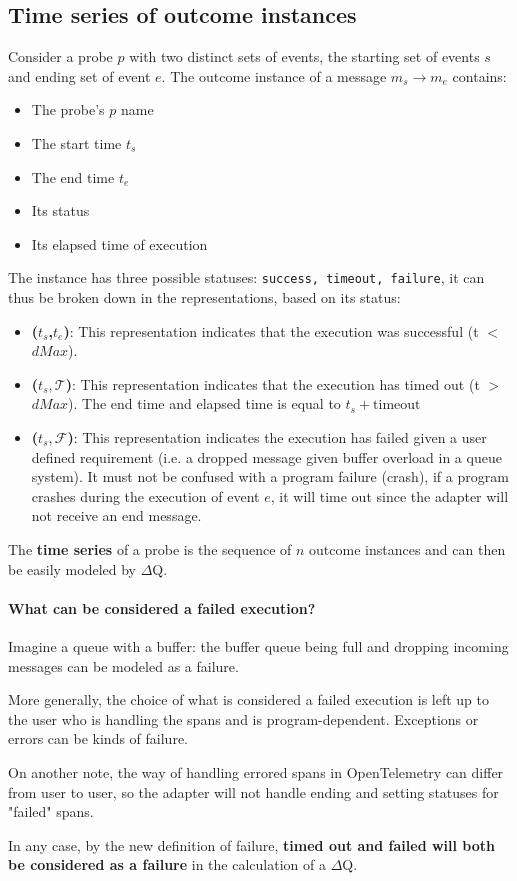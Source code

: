\subsection{Time series of outcome instances}
    Consider a probe $p$ with two distinct sets of events, the starting set of events $s$ and ending set of event $e$. The outcome instance of a message $m_s \rightarrow m_e$ contains:
    \begin{itemize}
        \item The probe's $p$ name
        \item The start time $t_s$
        \item The end time $t_e$
        \item Its status 
        \item Its elapsed time of execution
    \end{itemize}
    The instance has three possible statuses: \texttt{success, timeout, failure}, it can thus be broken down in the representations, based on its status:
    \begin{itemize}
        \item \textbf{($t_s$,$t_e$)}: This representation indicates that the execution was successful (t $<$ $dMax$). 
        \item \textbf{($t_s, \mathcal{T}$)}: This representation indicates that the execution has timed out (t $>$ $dMax$). The end time and elapsed time is equal to $t_s + \text{timeout}$ 
        \item \textbf{($t_s, \mathcal{F}$)}: This representation indicates the execution has failed given a user defined requirement (i.e. a dropped message given buffer overload in a queue system). It must not be confused with a program failure (crash), if a program crashes during the execution of event $e$, it will time out since the adapter will not receive an end message.
    \end{itemize}
    The \textbf{time series} of a probe is the sequence of $n$ outcome instances and can then be easily modeled by $\Delta$Q.

    \paragraph{What can be considered a failed execution?} Imagine a queue with a buffer: the buffer queue being full and dropping incoming messages can be modeled as a failure.

    More generally, the choice of what is considered a failed execution is left up to the user who is handling the spans and is program-dependent. Exceptions or errors can be kinds of failure. 

    On another note, the way of handling errored spans in OpenTelemetry can differ from user to user, so the adapter will not handle ending and setting statuses for "failed" spans. \cite{otel-err}
   
   In any case, by the new definition of failure, \textbf{timed out and failed will both be considered as a failure} in the calculation of a $\Delta$Q.
